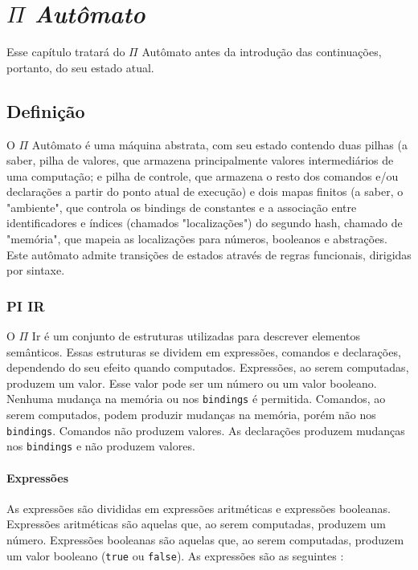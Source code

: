 \chapter{\textit{$\Pi$ Autômato}}\label{cap2}
Esse capítulo tratará do $\Pi$ Autômato antes da introdução das continuações, portanto, do seu estado atual.
\section{Definição}
O $\Pi$ Autômato é uma máquina abstrata, com seu estado contendo duas pilhas (a saber, pilha de valores, que armazena principalmente valores intermediários de uma computação; e pilha de controle, que armazena o resto dos comandos e/ou declarações a partir do ponto atual de execução) e dois mapas finitos (a saber, o "ambiente", que controla os bindings de constantes e a associação entre identificadores e índices (chamados "localizações") do segundo hash, chamado de "memória", que mapeia as localizações para números, booleanos e abstrações. Este autômato admite transições de estados através de regras funcionais, dirigidas por sintaxe.
\subsection{PI IR}
O $\Pi$ Ir é um conjunto de estruturas utilizadas para descrever elementos semânticos. Essas estruturas se dividem em expressões, comandos e declarações, dependendo do seu efeito quando computados. Expressões, ao serem computadas, produzem um valor. Esse valor pode ser um número ou um valor booleano. Nenhuma mudança na memória ou nos \texttt{bindings} é permitida. Comandos, ao serem computados, podem produzir mudanças na memória, porém não nos \texttt{bindings}. Comandos não produzem valores. As declarações produzem mudanças nos \texttt{bindings} e não produzem valores.
\subsubsection{Expressões}
As expressões são divididas em expressões aritméticas e expressões booleanas. Expressões aritméticas são aquelas que, ao serem computadas, produzem um número. Expressões booleanas são aquelas que, ao serem computadas, produzem um valor booleano (\texttt{true} ou \texttt{false}). As expressões são as seguintes : 

